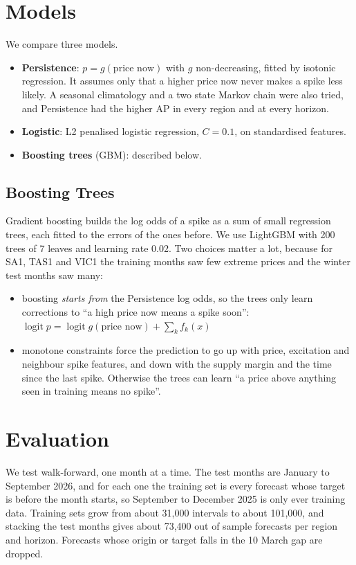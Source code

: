 \section{Models}
We compare three models.
\begin{itemize}
\item \textbf{Persistence}: $p = g(\text{price now})$ with $g$ non-decreasing, fitted by isotonic regression. It assumes only that
a higher price now never makes a spike less likely. A seasonal climatology and a two state Markov chain were also tried, and
Persistence had the higher AP in every region and at every horizon.
\item \textbf{Logistic}: L2 penalised logistic regression, $C = 0.1$, on standardised features.
\item \textbf{Boosting trees} (GBM): described below.
\end{itemize}

\subsection{Boosting Trees}
Gradient boosting \cite{friedman2001} builds the log odds of a spike as a sum of small regression trees, each fitted to the
errors of the ones before. We use LightGBM \cite{ke2017} with 200 trees of 7 leaves and learning rate 0.02. Two choices matter a
lot, because for SA1, TAS1 and VIC1 the training months saw few extreme prices and the winter test months saw many:
\begin{itemize}
\item boosting \emph{starts from} the Persistence log odds, so the trees only learn corrections to ``a high price now means a
spike soon'': $\operatorname{logit} p = \operatorname{logit} g(\text{price now}) + \sum_k f_k(x)$
\item monotone constraints force the prediction to go up with price, excitation and neighbour spike features, and down with the
supply margin and the time since the last spike. Otherwise the trees can learn ``a price above anything seen in training means no spike''.
\end{itemize}

\section{Evaluation}
We test walk-forward, one month at a time. The test months are January to September 2026, and for each one the training set is every forecast whose target is before the month starts, so September to December 2025 is only ever training
data. Training sets grow from about 31,000 intervals to about 101,000, and stacking the test months gives about 73,400 out of sample forecasts per region and horizon. Forecasts whose origin or target falls in the 10 March gap are dropped.

